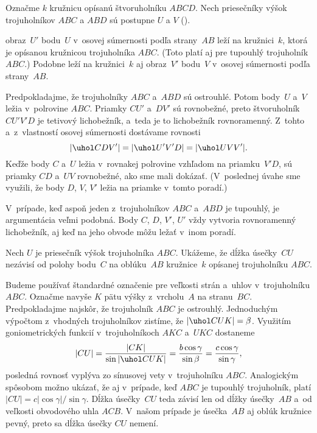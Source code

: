 {%
Označme $k$ kružnicu opísanú štvoruholníku $ABCD$. Nech priesečníky výšok trojuholníkov $ABC$ a $ABD$ sú postupne $U$ a $V$ (\obr).
%

obraz~$U'$ bodu~$U$ v~osovej súmernosti podľa strany~$AB$ leží na kružnici~$k$, ktorá je opísanou kružnicou trojuholníka $ABC$. (Toto platí aj pre tupouhlý trojuholník $ABC$.) Podobne leží na kružnici~$k$ aj obraz~$V'$ bodu~$V$ v~osovej súmernosti podľa strany~$AB$.

Predpokladajme, že trojuholníky $ABC$ a~$ABD$ sú ostrouhlé. Potom body~$U$ a~$V$ ležia v~polrovine $ABC$. Priamky $CU'$ a~$DV'$ sú rovnobežné, preto štvoruholník $CU'V'D$ je tetivový lichobežník, a~teda je to lichobežník rovnoramenný. Z~tohto a~z~vlastností osovej súmernosti dostávame rovnosti
$$
|\uhol CDV'| = |\uhol U'V'D| = |\uhol UVV'|.
$$
Keďže body $C$ a~$U$ ležia v~rovnakej polrovine vzhľadom na priamku~$V'D$, sú priamky $CD$ a~$UV$ rovnobežné, ako sme mali dokázať. (V~poslednej úvahe sme využili, že body $D$, $V$, $V'$ ležia na priamke v~tomto poradí.)

V~prípade, keď aspoň jeden z~trojuholníkov $ABC$ a~$ABD$ je tupouhlý, je argumentácia veľmi podobná. Body $C$, $D$, $V'$, $U'$ vždy vytvoria rovnoramenný lichobežník, aj keď na jeho obvode môžu ležať v~inom poradí.

\ineriesenie
Nech $U$ je priesečník výšok trojuholníka $ABC$. Ukážeme, že dĺžka úsečky~$CU$ nezávisí od polohy bodu~$C$ na oblúku~$AB$ kružnice~$k$ opísanej trojuholníku $ABC$.

Budeme používať štandardné označenie pre veľkosti strán a~uhlov v~trojuholníku $ABC$. Označme navyše $K$ pätu výšky z~vrcholu~$A$ na stranu~$BC$. Predpokladajme najskôr, že trojuholník $ABC$ je ostrouhlý. Jednoduchým výpočtom z~vhodných trojuholníkov zistíme, že $|\uhol CUK|=\beta$. Využitím goniometrických funkcií v~trojuholníkoch $AKC$ a~$UKC$ dostaneme
$$
|CU|={|CK|\over \sin |\uhol CUK|}={b \cos\gamma\over \sin\beta}={c\cos\gamma\over \sin\gamma},
$$
posledná rovnosť vyplýva zo sínusovej vety v~trojuholníku $ABC$. Analogickým spôsobom možno ukázať, že aj v~prípade, keď $ABC$ je tupouhlý trojuholník, platí $|CU|=c|\cos\gamma|/\sin\gamma$. Dĺžka úsečky~$CU$ teda závisí len od dĺžky úsečky~$AB$ a~od veľkosti obvodového uhla $ACB$. V~našom prípade je úsečka~$AB$ aj oblúk kružnice pevný, preto sa dĺžka úsečky $CU$ nemení.

}

